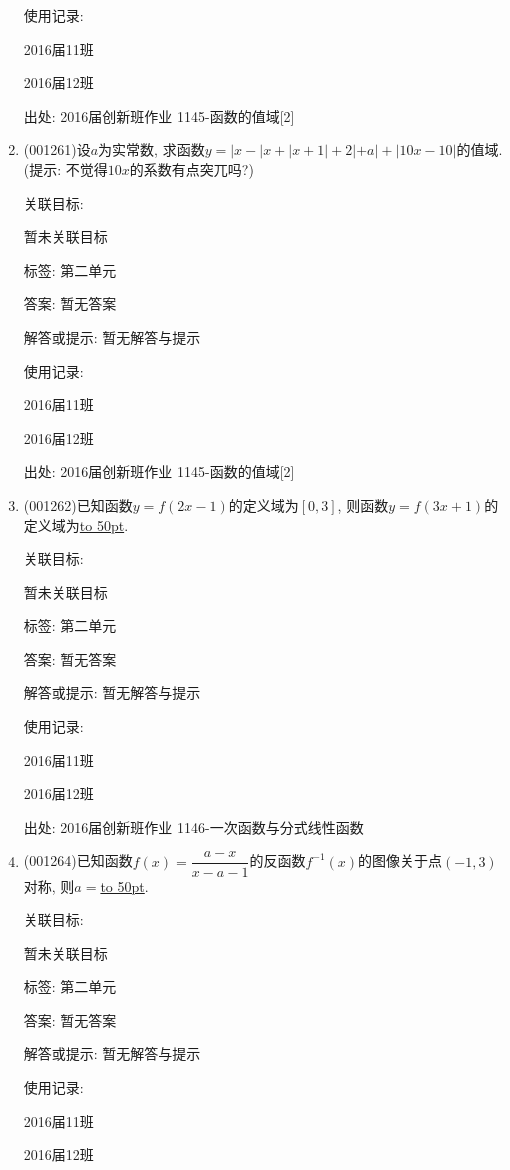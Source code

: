 \documentclass[10pt,a4paper]{article}
\newcommand{\blank}[1]{\underline{\hbox to #1pt{}}}
\begin{document}
\begin{enumerate}[1.]
使用记录:

2016届11班	

2016届12班	


出处: 2016届创新班作业	1145-函数的值域[2]
\item { (001261)}设$a$为实常数, 求函数$y=|x-|x+|x+1|+2|+a|+|10x-10|$的值域. (提示: 不觉得$10x$的系数有点突兀吗?)


关联目标:

暂未关联目标



标签: 第二单元

答案: 暂无答案

解答或提示: 暂无解答与提示

使用记录:

2016届11班	

2016届12班	


出处: 2016届创新班作业	1145-函数的值域[2]
\item { (001262)}已知函数$y=f(2x-1)$的定义域为$[0,3]$, 则函数$y=f(3x+1)$的定义域为\blank{50}.


关联目标:

暂未关联目标



标签: 第二单元

答案: 暂无答案

解答或提示: 暂无解答与提示

使用记录:

2016届11班	

2016届12班	


出处: 2016届创新班作业	1146-一次函数与分式线性函数
\item { (001264)}已知函数$f(x)=\dfrac{a-x}{x-a-1}$的反函数$f^{-1}(x)$的图像关于点$(-1,3)$对称, 则$a=$\blank{50}.


关联目标:

暂未关联目标



标签: 第二单元

答案: 暂无答案

解答或提示: 暂无解答与提示

使用记录:

2016届11班	

2016届12班	



\end{enumerate}
\end{document}

